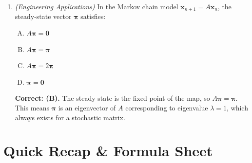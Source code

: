 \documentclass[12pt,a4paper]{article}
\begin{document}
\begin{enumerate}
  \item \textit{(Engineering Applications)} In the Markov chain model \(\mathbf{x}_{n+1} = A\mathbf{x}_n\), the steady-state vector \(\boldsymbol{\pi}\) satisfies:
    \begin{enumerate}[(A)]
      \item \(A\boldsymbol{\pi} = \mathbf{0}\)
      \item \textbf{\(A\boldsymbol{\pi} = \boldsymbol{\pi}\)}
      \item \(A\boldsymbol{\pi} = 2\boldsymbol{\pi}\)
      \item \(\boldsymbol{\pi} = \mathbf{0}\)
    \end{enumerate}
    \textbf{Correct: (B).} The steady state is the fixed point of the map, so \(A\boldsymbol{\pi} = \boldsymbol{\pi}\). This means \(\boldsymbol{\pi}\) is an eigenvector of \(A\) corresponding to eigenvalue \(\lambda = 1\), which always exists for a stochastic matrix.
\end{enumerate}

\section{Quick Recap \& Formula Sheet}
\end{document}
